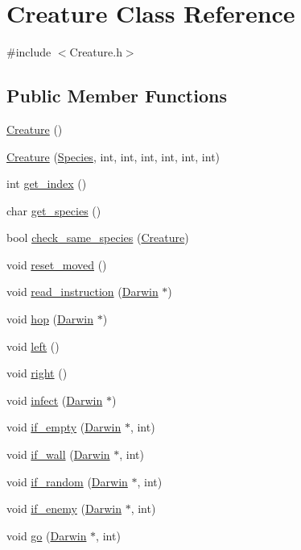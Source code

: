 \hypertarget{classCreature}{\section{Creature Class Reference}
\label{classCreature}
}


{\ttfamily \#include $<$Creature.\-h$>$}

\subsection*{Public Member Functions}
\begin{DoxyCompactItemize}
\item 
\hyperlink{classCreature_a597cc3b08ee17de46c3e7ec3cf0d9b58}{Creature} ()
\item 
\hyperlink{classCreature_a6753ade73687cdedbd86924276aabbe8}{Creature} (\hyperlink{classSpecies}{Species}, int, int, int, int, int, int)
\item 
int \hyperlink{classCreature_a78cb442de78d12c3a4cf1250cb93872c}{get\-\_\-index} ()
\item 
char \hyperlink{classCreature_a47f20e18948c835b6e6251a2ca6da377}{get\-\_\-species} ()
\item 
bool \hyperlink{classCreature_a8417870c8a478b2c271e898b5aa4a346}{check\-\_\-same\-\_\-species} (\hyperlink{classCreature}{Creature})
\item 
void \hyperlink{classCreature_ac0f588739fc6cd2d1f778460281a7069}{reset\-\_\-moved} ()
\item 
void \hyperlink{classCreature_a99766906233c620a05d0b584ef0b9a96}{read\-\_\-instruction} (\hyperlink{classDarwin}{Darwin} $\ast$)
\item 
void \hyperlink{classCreature_af914eb211224cefc2260e6b3f7bb899a}{hop} (\hyperlink{classDarwin}{Darwin} $\ast$)
\item 
void \hyperlink{classCreature_abb2923e06edcc39531a26882ad85f264}{left} ()
\item 
void \hyperlink{classCreature_a17036acfdcc81a43384fb8c78898718f}{right} ()
\item 
void \hyperlink{classCreature_aad79b02d5f8fe2098616f19fde4d9124}{infect} (\hyperlink{classDarwin}{Darwin} $\ast$)
\item 
void \hyperlink{classCreature_a1e351c55112c43b37fb9448c40bc948e}{if\-\_\-empty} (\hyperlink{classDarwin}{Darwin} $\ast$, int)
\item 
void \hyperlink{classCreature_af5996baf04ef78988cbf59d42f1c78fc}{if\-\_\-wall} (\hyperlink{classDarwin}{Darwin} $\ast$, int)
\item 
void \hyperlink{classCreature_ae99602021ee9904d3e8b7c909a414f6a}{if\-\_\-random} (\hyperlink{classDarwin}{Darwin} $\ast$, int)
\item 
void \hyperlink{classCreature_a30cc07bcfd7d454aee174a0684e19247}{if\-\_\-enemy} (\hyperlink{classDarwin}{Darwin} $\ast$, int)
\item 
void \hyperlink{classCreature_ae3248d8c7cd8faa1254c3b0b8e1a34e8}{go} (\hyperlink{classDarwin}{Darwin} $\ast$, int)
\end{DoxyCompactItemize}
